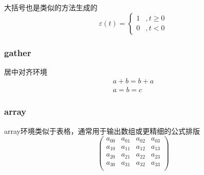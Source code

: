 大括号也是类似的方法生成的
$$
\varepsilon(t)=
\left\{
\begin{aligned}
    1&,t\ge 0\\
    0&,t<0
\end{aligned}
\right.
$$

\subsubsection{gather}
居中对齐环境
\begin{gather*}
    a+b=b+a\\
    a=b=c
\end{gather*}

\subsubsection{array}
array环境类似于表格，通常用于输出数组或更精细的公式排版
$$
\left(
    \begin{array}{cccc}
        a_{00}&a_{01}&a_{02}&a_{03}\\
        a_{10}&a_{11}&a_{12}&a_{13}\\
        a_{20}&a_{21}&a_{22}&a_{23}\\
        a_{30}&a_{31}&a_{32}&a_{33}\\
    \end{array}
\right)
$$
